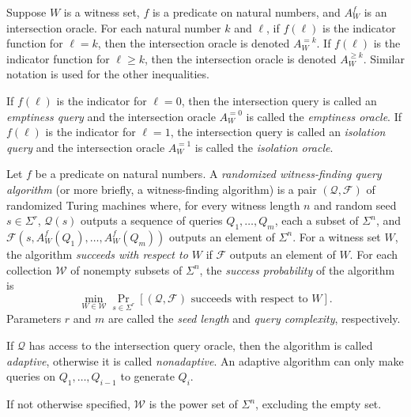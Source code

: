 \documentclass{article}
\newcommand{\mc}{\mathcal}
\begin{document}
\begin{definition}
  Suppose $W$ is a witness set, $f$ is a predicate on natural numbers, and $A^f_W$ is an intersection oracle.
  For each natural number $k$ and $\ell$, if $f(\ell)$ is the indicator function for $\ell = k$, then the intersection oracle is denoted $A^{=k}_W$.
  If $f(\ell)$ is the indicator function for $\ell \geq k$, then the intersection oracle is denoted $A^{\geq k}_W$.
  Similar notation is used for the other inequalities.
\end{definition}

If $f(\ell)$ is the indicator for $\ell = 0$, then the intersection query is called an \emph{emptiness query} and the intersection oracle $A^{=0}_W$ is called the \emph{emptiness oracle}.
If $f(\ell)$ is the indicator for $\ell = 1$, the intersection query is called an \emph{isolation query} and the intersection oracle $A^{=1}_W$ is called the \emph{isolation oracle}.

\begin{definition}
  Let $f$ be a predicate on natural numbers.
  A \emph{randomized witness-finding query algorithm} (or more briefly, a witness-finding algorithm) is a pair $(\mc{Q}, \mc{F})$ of randomized Turing machines where, for every witness length $n$ and random seed $s \in \Sigma^r$, $\mc{Q}(s)$ outputs a sequence of queries $Q_1, \dotsc, Q_m$, each a subset of $\Sigma^n$, and $\mc{F}(s, A^f_W(Q_1), \dotsc, A^f_W(Q_m))$ outputs an element of $\Sigma^n$.
  For a witness set $W$, the algorithm \emph{succeeds with respect to $W$} if $\mc{F}$ outputs an element of $W$.
  For each collection $\mc{W}$ of nonempty subsets of $\Sigma^n$, the \emph{success probability} of the algorithm is
  \begin{equation*}
    \min_{W \in \mc{W}} \Pr_{s \in \Sigma^r} [(\mc{Q}, \mc{F}) \text{ succeeds with respect to } W].
  \end{equation*}
  Parameters $r$ and $m$ are called the \emph{seed length} and \emph{query complexity}, respectively.

  If $\mc{Q}$ has access to the intersection query oracle, then the algorithm is called \emph{adaptive}, otherwise it is called \emph{nonadaptive}.
  An adaptive algorithm can only make queries on $Q_1, \dotsc, Q_{i - 1}$ to generate $Q_i$.
\end{definition}

If not otherwise specified, $\mc{W}$ is the power set of $\Sigma^n$, excluding the empty set.
\end{document}
